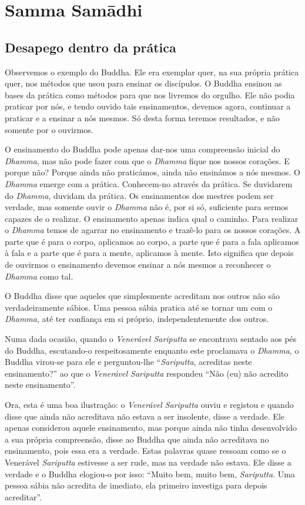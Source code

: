 \chapter{Samma Samādhi}

\section{Desapego dentro da prática}

Observemos o exemplo do Buddha. Ele era exemplar quer, na sua própria
prática quer, nos métodos que usou para ensinar os discípulos. O Buddha
ensinou as bases da prática como métodos para que nos livremos do
orgulho. Ele não podia praticar por nós, e tendo ouvido tais
ensinamentos, devemos agora, continuar a praticar e a ensinar a nós
mesmos. Só desta forma teremos resultados, e não somente por o ouvirmos.

O ensinamento do Buddha pode apenas dar-nos uma compreensão inicial do
\emph{Dhamma}, mas não pode fazer com que o \emph{Dhamma} fique nos
nossos corações. E porque não? Porque ainda não praticámos, ainda não
ensinámos a nós mesmos. O \emph{Dhamma} emerge com a prática.
Conhecem-no através da prática. Se duvidarem do \emph{Dhamma}, duvidam
da prática. Os ensinamentos dos mestres podem ser verdade, mas somente
ouvir o \emph{Dhamma} não é, por si só, suficiente para sermos capazes
de o realizar. O ensinamento apenas indica qual o caminho. Para realizar
o \emph{Dhamma} temos de agarrar no ensinamento e trazê-lo para os
nossos corações. A parte que é para o corpo, aplicamos ao corpo, a parte
que é para a fala aplicamos à fala e a parte que é para a mente,
aplicamos à mente. Isto significa que depois de ouvirmos o ensinamento
devemos ensinar a nós mesmos a reconhecer o \emph{Dhamma} como
tal.

O Buddha disse que aqueles que simplesmente acreditam nos outros não são
verdadeiramente sábios. Uma pessoa sábia pratica até se tornar um com o
\emph{Dhamma}, até ter confiança em si próprio, independentemente dos
outros.

Numa dada ocasião, quando o \emph{Venerável Sariputta} se encontrava sentado aos
pés do Buddha, escutando-o respeitosamente enquanto este proclamava o
\emph{Dhamma}, o Buddha virou-se para ele e perguntou-lhe ``\emph{Sariputta},
acreditas neste ensinamento?'' ao que o \emph{Venerável Sariputta} respondeu
``Não (eu) não acredito neste ensinamento''.

Ora, esta é uma boa ilustração: o \emph{Venerável} \emph{Sariputta}
ouviu e registou e quando disse que ainda não acreditava não estava a
ser insolente, disse a verdade. Ele apenas considerou aquele
ensinamento, mas porque ainda não tinha desenvolvido a sua própria
compreensão, disse ao Buddha que ainda não acreditava no ensinamento,
pois essa era a verdade. Estas palavras quase ressoam como se o
Venerável \emph{Sariputta} estivesse a ser rude, mas na verdade não
estava. Ele disse a verdade e o Buddha elogiou-o por isso: ``Muito bem,
muito bem, \emph{Sariputta}. Uma pessoa sábia não acredita de imediato,
ela primeiro investiga para depois acreditar''.

